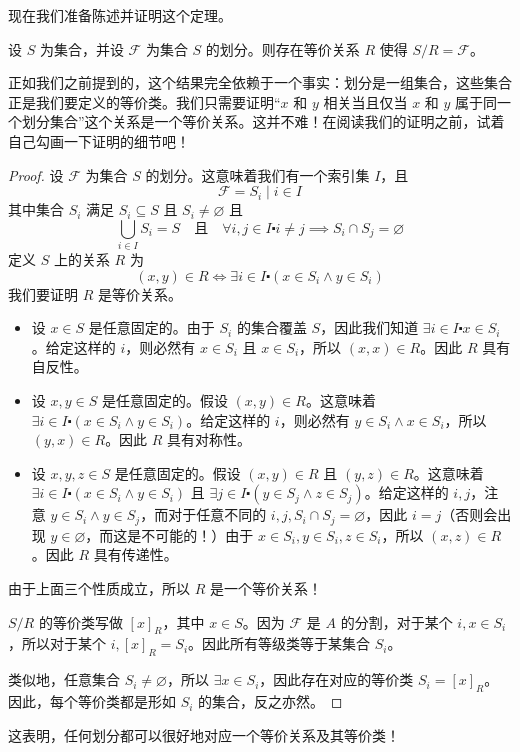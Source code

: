 现在我们准备陈述并证明这个定理。

\begin{theorem}\label{theorem6.4.12}
    设 $S$ 为集合，并设 $\mathcal{F}$ 为集合 $S$ 的划分。则存在等价关系 $R$ 使得 $S/R=\mathcal{F}$。
\end{theorem}

正如我们之前提到的，这个结果完全依赖于一个事实：划分是一组集合，这些集合正是我们要定义的等价类。我们只需要证明``$x$ 和 $y$ 相关当且仅当 $x$ 和 $y$ 属于同一个划分集合''这个关系是一个等价关系。这并不难！在阅读我们的证明之前，试着自己勾画一下证明的细节吧！

\begin{proof}
    设 $\mathcal{F}$ 为集合 $S$ 的划分。这意味着我们有一个索引集 $I$，且
    \[\mathcal{F} = {S_i \mid i \in I}\]
    其中集合 $S_i$ 满足 $S_i \subseteq S$ 且 $S_i \ne \varnothing$ 且
    \[\bigcup_{i \in I} S_i = S \quad \text{且} \quad \forall i, j \in I \centerdot i \ne j \implies S_i \cap S_j = \varnothing\]
    定义 $S$ 上的关系 $R$ 为
    \[(x, y) \in R \iff \exists i \in I \centerdot (x \in S_i \land y \in S_i)\]
    我们要证明 $R$ 是等价关系。

    \begin{itemize}
        \item 设 $x \in S$ 是任意固定的。由于 $S_i$ 的集合覆盖 $S$，因此我们知道 $\exists i \in I \centerdot x \in S_i$。给定这样的 $i$，则必然有 $x \in S_i$ 且 $x \in S_i$，所以 $(x,x) \in R$。因此 $R$ 具有自反性。
        \item 设 $x, y \in S$ 是任意固定的。假设 $(x, y) \in R$。这意味着 $\exists i \in I \centerdot (x \in S_i \land y \in S_i)$。给定这样的 $i$，则必然有 $y \in S_i \land x \in S_i$，所以 $(y,x) \in R$。因此 $R$ 具有对称性。
        \item 设 $x, y, z \in S$ 是任意固定的。假设 $(x, y) \in R$ 且 $(y, z) \in R$。这意味着 $\exists i \in I \centerdot (x \in S_i \land y \in S_i)$ 且 $\exists j \in I \centerdot (y \in S_j \land z \in S_j)$。给定这样的 $i,j$，注意 $y \in S_i \land y \in S_j$，而对于任意不同的 $i,j, S_i \cap S_j = \varnothing$，因此 $i=j$（否则会出现 $y \in \varnothing$，而这是不可能的！）由于 $x \in S_i, y \in S_i, z \in S_i$，所以 $(x,z) \in R$。因此 $R$ 具有传递性。
    \end{itemize}
    由于上面三个性质成立，所以 $R$ 是一个等价关系！

    $S/R$ 的等价类写做 $[x]_R$，其中 $x \in S$。因为 $\mathcal{F}$ 是 $A$ 的分割，对于某个 $i, x \in S_i$，所以对于某个 $i, [x]_R = S_i$。因此所有等级类等于某集合 $S_i$。

    类似地，任意集合 $S_i \ne \varnothing$，所以 $\exists x \in S_i$，因此存在对应的等价类 $S_i=[x]_R$。因此，每个等价类都是形如 $S_i$ 的集合，反之亦然。
\end{proof}

这表明，任何划分都可以很好地对应一个等价关系及其等价类！
